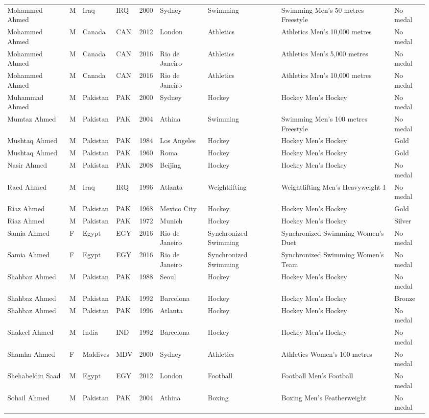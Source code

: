 \documentclass{article}%
\begin{document}
\begin{longtable}{p{1.5cm} p{0.5cm} p{2cm} p{1cm} p{1cm} p{1.5cm} p{1.5cm} p{5cm} p{1.5cm}}
Mohammed Ahmed&M&Iraq&IRQ&2000&Sydney&Swimming&Swimming Men's 50 metres Freestyle&No medal\\%
Mohammed Ahmed&M&Canada&CAN&2012&London&Athletics&Athletics Men's 10,000 metres&No medal\\%
Mohammed Ahmed&M&Canada&CAN&2016&Rio de Janeiro&Athletics&Athletics Men's 5,000 metres&No medal\\%
Mohammed Ahmed&M&Canada&CAN&2016&Rio de Janeiro&Athletics&Athletics Men's 10,000 metres&No medal\\%
Muhammad Ahmed&M&Pakistan&PAK&2000&Sydney&Hockey&Hockey Men's Hockey&No medal\\%
Mumtaz Ahmed&M&Pakistan&PAK&2004&Athina&Swimming&Swimming Men's 100 metres Freestyle&No medal\\%
Mushtaq Ahmed&M&Pakistan&PAK&1984&Los Angeles&Hockey&Hockey Men's Hockey&Gold\\%
Mushtaq Ahmed&M&Pakistan&PAK&1960&Roma&Hockey&Hockey Men's Hockey&Gold\\%
Nasir Ahmed&M&Pakistan&PAK&2008&Beijing&Hockey&Hockey Men's Hockey&No medal\\%
Raed Ahmed&M&Iraq&IRQ&1996&Atlanta&Weightlifting&Weightlifting Men's Heavyweight I&No medal\\%
Riaz Ahmed&M&Pakistan&PAK&1968&Mexico City&Hockey&Hockey Men's Hockey&Gold\\%
Riaz Ahmed&M&Pakistan&PAK&1972&Munich&Hockey&Hockey Men's Hockey&Silver\\%
Samia Ahmed&F&Egypt&EGY&2016&Rio de Janeiro&Synchronized Swimming&Synchronized Swimming Women's Duet&No medal\\%
Samia Ahmed&F&Egypt&EGY&2016&Rio de Janeiro&Synchronized Swimming&Synchronized Swimming Women's Team&No medal\\%
Shahbaz Ahmed&M&Pakistan&PAK&1988&Seoul&Hockey&Hockey Men's Hockey&No medal\\%
Shahbaz Ahmed&M&Pakistan&PAK&1992&Barcelona&Hockey&Hockey Men's Hockey&Bronze\\%
Shahbaz Ahmed&M&Pakistan&PAK&1996&Atlanta&Hockey&Hockey Men's Hockey&No medal\\%
Shakeel Ahmed&M&India&IND&1992&Barcelona&Hockey&Hockey Men's Hockey&No medal\\%
Shamha Ahmed&F&Maldives&MDV&2000&Sydney&Athletics&Athletics Women's 100 metres&No medal\\%
Shehabeldin Saad&M&Egypt&EGY&2012&London&Football&Football Men's Football&No medal\\%
Sohail Ahmed&M&Pakistan&PAK&2004&Athina&Boxing&Boxing Men's Featherweight&No medal\\%

\end{longtable}
\end{document}
